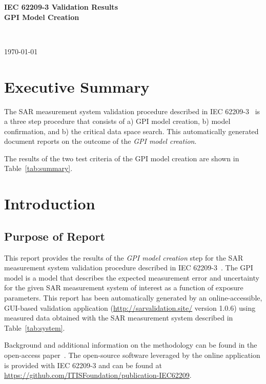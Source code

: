 \documentclass{article}
\begin{document}
\flushright
\begin{Large}
\textbf{IEC 62209-3 Validation Results} \\
\textbf{GPI Model Creation}
\end{Large} \\
\begin{small}
\today \\ \currenttime
\end{small}
\flushleft

\section{Executive Summary}\label{sec:exec_summary}

The SAR measurement system validation procedure described in IEC 62209-3~\cite{standard} is a three step procedure that consists of a) GPI model creation, b) model confirmation, and b) the critical data space search. This automatically generated document reports on the outcome of the \textit{GPI model creation}.



The results of the two test criteria of the GPI model creation are shown in Table~\ref{tab:summary}.





\section{Introduction}\label{sec:start}

\subsection{Purpose of Report}\label{sec:intro}
This report provides the results of the\textit{ GPI model creation} step for the SAR measurement system validation procedure described in IEC 62209-3~\cite{standard}. The GPI model is a model that describes the expected measurement error and uncertainty for the given SAR measurement system of interest as a function of exposure parameters. This report has been automatically generated by an online-accessible, GUI-based validation application (\url{http://sarvalidation.site/} version 1.0.6) using measured data obtained with the SAR measurement system described in Table~\ref{tab:system}.

Background and additional information on the methodology can be found in the open-access paper~\cite{gpi-paper}. The open-source software leveraged by the online application is provided with IEC 62209-3 and can be found at
\url{https://github.com/ITISFoundation/publication-IEC62209}.
\end{document}
